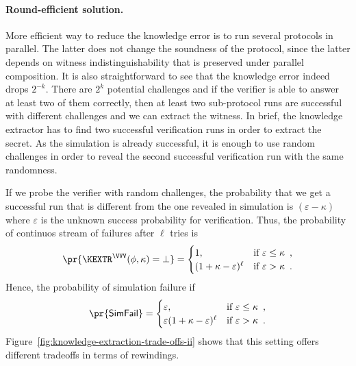 \documentclass{crypto-exercise}
\newcommand{\SFAIL}{\mathsf{SimFail}}
\begin{document}
\begin{solution}
\paragraph{Round-efficient solution.}
More efficient way to reduce the knowledge error is to run several protocols in parallel. The latter does not change the soundness of the protocol, since the latter depends on witness indistinguishability that is preserved under parallel composition. It is also straightforward to see that the knowledge error indeed drops $2^{-k}$. There are $2^k$ potential challenges and if the verifier is able to answer at least two of them correctly, then at least two sub-protocol runs are successful with different challenges and we can extract the witness. In brief, the knowledge extractor has to find two successful verification runs in order to extract the secret. As the simulation is already successful, it is enough to use random challenges in order to reveal the second successful verification run with the same randomness. 

If we probe the verifier with random challenges, the probability that we get a successful run that is different from the one revealed in simulation is $(\varepsilon-\kappa)$ where $\varepsilon$ is the unknown success probability  for verification. Thus, the probability of continuos stream of failures after $\ell$ tries is 
\begin{align*}
\pr{\KEXTR^{\VVV}(\phi,\kappa)=\bot}
=
\begin{cases}
1,&\text{if }\varepsilon\leq\kappa\enspace,\\
(1+\kappa-\varepsilon)^\ell &\text{if }\varepsilon>\kappa\enspace.
\end{cases}
\end{align*}      
Hence, the probability of simulation failure if
\begin{align*}
\pr{\SFAIL}
=
\begin{cases}
\varepsilon,&\text{if }\varepsilon\leq\kappa\enspace,\\
\varepsilon(1+\kappa-\varepsilon)^\ell &\text{if }\varepsilon>\kappa\enspace.
\end{cases}
\end{align*}      
Figure~\ref{fig:knowledge-extraction-trade-offs-ii} shows that this setting offers different tradeoffs in terms of rewindings.	



\end{solution}
\end{document}
